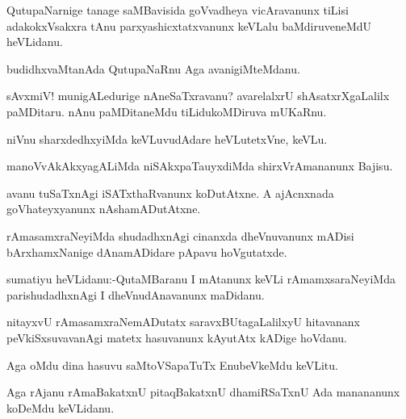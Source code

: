 \documentclass{article}
\begin{document}
\begin{mn}%
QutupaNarnige tanage saMBavisida goVvadheya vicAravanunx tiLisi adakokxVsakxra tAnu 
parxyashicxtatxvanunx keVLalu baMdiruveneMdU heVLidanu.
\end{mn}

\begin{mn}%
budidhxvaMtanAda QutupaNaRnu Aga avanigiMteMdanu.
\end{mn}

\begin{mn}%
sAvxmiV! munigALedurige nAneSaTxravanu? avarelalxrU shAsatxrXgaLalilx paMDitaru. nAnu 
paMDitaneMdu tiLidukoMDiruva mUKaRnu.
\end{mn}

\begin{mn}%
niVnu sharxdedhxyiMda keVLuvudAdare heVLutetxVne, keVLu.
\end{mn}

\begin{mn}%
manoVvAkAkxyagALiMda niSAkxpaTauyxdiMda shirxVrAmananunx Bajisu.
\end{mn}

\begin{mn}%
avanu tuSaTxnAgi iSATxthaRvanunx koDutAtxne. A ajAcnxnada goVhateyxyanunx nAshamADutAtxne.
\end{mn}

\begin{mn}%
rAmasamxraNeyiMda shudadhxnAgi cinanxda dheVnuvanunx mADisi bArxhamxNanige dAnamADidare 
pApavu hoVgutatxde.
\end{mn}

\begin{mn}%
sumatiyu heVLidanu:-QutaMBaranu I mAtanunx keVLi rAmamxsaraNeyiMda parishudadhxnAgi I 
dheVnudAnavanunx maDidanu.
\end{mn}

\begin{mn}%
nitayxvU rAmasamxraNemADutatx saravxBUtagaLalilxyU hitavananx peVkiSxsuvavanAgi matetx 
hasuvanunx kAyutAtx kADige hoVdanu.
\end{mn}

\begin{mn}%
Aga oMdu dina hasuvu saMtoVSapaTuTx EnubeVkeMdu keVLitu.
\end{mn}

\begin{mn}%
Aga rAjanu rAmaBakatxnU pitaqBakatxnU dhamiRSaTxnU Ada manananunx koDeMdu keVLidanu.
\end{mn}
\end{document}

